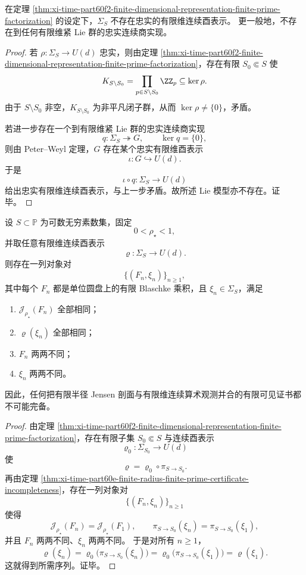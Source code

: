 \begin{corollary}\label{cor:xi-time-part60f2-no-faithful-finite-dimensional-lie-model}
在定理 \ref{thm:xi-time-part60f2-finite-dimensional-representation-finite-prime-factorization} 的设定下，\(\Sigma_S\) 不存在忠实的有限维连续酉表示。
更一般地，不存在到任何有限维紧 Lie 群的忠实连续商实现。
\end{corollary}
\begin{proof}
若 \(\rho:\Sigma_S\to U(d)\) 忠实，则由定理 \ref{thm:xi-time-part60f2-finite-dimensional-representation-finite-prime-factorization}，存在有限 \(S_0\Subset S\) 使
\[
K_{S\setminus S_0}=\prod_{p\in S\setminus S_0}\ZZ_p
\subseteq \ker\rho.
\]
由于 \(S\setminus S_0\) 非空，\(K_{S\setminus S_0}\) 为非平凡闭子群，从而 \(\ker\rho\neq \{0\}\)，矛盾。

若进一步存在一个到有限维紧 Lie 群的忠实连续商实现
\[
q:\Sigma_S\twoheadrightarrow G,
\qquad
\ker q=\{0\},
\]
则由 Peter--Weyl 定理，\(G\) 存在某个忠实有限维酉表示
\[
\iota:G\hookrightarrow U(d).
\]
于是
\[
\iota\circ q:\Sigma_S\to U(d)
\]
给出忠实有限维连续酉表示，与上一步矛盾。故所述 Lie 模型亦不存在。证毕。
\end{proof}

\begin{theorem}\label{thm:xi-time-part60f2-finite-radius-finite-dimensional-unified-collapse}
设 \(S\subset\mathbb P\) 为可数无穷素数集，固定
\[
0<\rho_\star<1,
\]
并取任意有限维连续酉表示
\[
\varrho:\Sigma_S\to U(d).
\]
则存在一列对象对
\[
\{(F_n,\xi_n)\}_{n\ge 1},
\]
其中每个 \(F_n\) 都是单位圆盘上的有限 Blaschke 乘积，且 \(\xi_n\in \Sigma_S\)，满足
\begin{enumerate}
  \item \(\mathcal J_{\rho_\star}(F_n)\) 全部相同；
  \item \(\varrho(\xi_n)\) 全部相同；
  \item \(F_n\) 两两不同；
  \item \(\xi_n\) 两两不同。
\end{enumerate}
因此，任何把有限半径 Jensen 剖面与有限维连续算术观测并合的有限可见证书都不可能完备。
\end{theorem}
\begin{proof}
由定理 \ref{thm:xi-time-part60f2-finite-dimensional-representation-finite-prime-factorization}，存在有限子集 \(S_0\Subset S\) 与连续酉表示
\[
\varrho_0:\Sigma_{S_0}\to U(d)
\]
使
\[
\varrho=\varrho_0\circ \pi_{S\to S_0}.
\]
再由定理 \ref{thm:xi-time-part60e-finite-radius-finite-prime-certificate-incompleteness}，存在一列对象对
\[
\{(F_n,\xi_n)\}_{n\ge 1}
\]
使得
\[
\mathcal J_{\rho_\star}(F_n)
=
\mathcal J_{\rho_\star}(F_1),
\qquad
\pi_{S\to S_0}(\xi_n)
=
\pi_{S\to S_0}(\xi_1),
\]
并且 \(F_n\) 两两不同、\(\xi_n\) 两两不同。
于是对所有 \(n\ge 1\)，
\[
\varrho(\xi_n)
=
\varrho_0\!\bigl(\pi_{S\to S_0}(\xi_n)\bigr)
=
\varrho_0\!\bigl(\pi_{S\to S_0}(\xi_1)\bigr)
=
\varrho(\xi_1).
\]
这就得到所需序列。证毕。
\end{proof}

